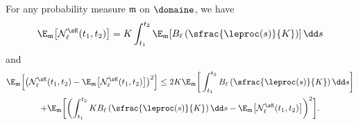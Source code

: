 \begin{proposition}\label{prop-rentree}
For any probability measure $\mathfrak{m}$ on $\domaine$, we have
\[
\E_{\mathfrak{m}}\bigl[\mathcal{N}^{\sK}_\ell(t_{1},t_{2}) \bigr]=
K \int_{t_{1}}^{t_{2}} \E_{\mathfrak{m}}\!\left[B_{\ell}\left(\sfrac{\leproc(s)}{K}\right)\right] \dd s
\]
and
\begin{multline*}
\E_{\mathfrak{m}} \Bigl[\bigl(\mathcal{N}^{\sK}_\ell(t_{1},t_{2})
- \E_{\mathfrak{m}}\bigl[\mathcal{N}^{\sK}_\ell(t_{1},t_{2})\bigr] \bigr)^2 \Bigr]
\leq 2K\E_{\mathfrak{m}}\!\left[\,\int_{t_{1}}^{t_{2}} B_{\ell}\left(\sfrac{\leproc(s)}{K}\right) \dd s \right]\\
+ \E_{\mathfrak{m}} \biggl[\biggl(\int_{t_{1}}^{t_{2}} K B_{\ell}\left(\sfrac{\leproc(s)}{K}\right) \dd s
- \E_{\mathfrak{m}}\bigl[\mathcal{N}^{\sK}_\ell(t_{1},t_{2})\bigr] \biggr)^2\biggr].
\end{multline*}
\end{proposition}

